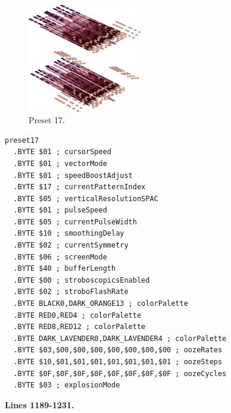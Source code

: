 \vspace*{0.5cm}
\begin{minipage}[b]{0.48\linewidth}
\begin{figure}[H]                                                          
  \centering                                                             
  \begin{adjustbox}{width=5cm,center}                                   
  \includegraphics[width=5cm]{src/colorspace_presets/preset17-45.png}%
  \end{adjustbox}                                                        
\caption*{Preset 17.}                                           
\end{figure}                                                               
\end{minipage}
\hspace{0.1cm}
\begin{minipage}[b]{0.48\linewidth}                                                                         
\begin{lstlisting}[basicstyle=\ttfamily\tiny]
preset17
  .BYTE $01 ; cursorSpeed
  .BYTE $01 ; vectorMode
  .BYTE $01 ; speedBoostAdjust
  .BYTE $17 ; currentPatternIndex
  .BYTE $05 ; verticalResolutionSPAC
  .BYTE $01 ; pulseSpeed
  .BYTE $05 ; currentPulseWidth
  .BYTE $10 ; smoothingDelay
  .BYTE $02 ; currentSymmetry
  .BYTE $06 ; screenMode
  .BYTE $40 ; bufferLength
  .BYTE $00 ; stroboscopicsEnabled
  .BYTE $02 ; stroboFlashRate
  .BYTE BLACK0,DARK_ORANGE13 ; colorPalette
  .BYTE RED0,RED4 ; colorPalette
  .BYTE RED8,RED12 ; colorPalette
  .BYTE DARK_LAVENDER0,DARK_LAVENDER4 ; colorPalette
  .BYTE $03,$00,$00,$00,$00,$00,$00,$00 ; oozeRates
  .BYTE $10,$01,$01,$01,$01,$01,$01,$01 ; oozeSteps
  .BYTE $0F,$0F,$0F,$0F,$0F,$0F,$0F,$0F ; oozeCycles
  .BYTE $03 ; explosionMode
\end{lstlisting}
\end{minipage}
\clearpage
\textbf{Lines 1189-1231. } 
